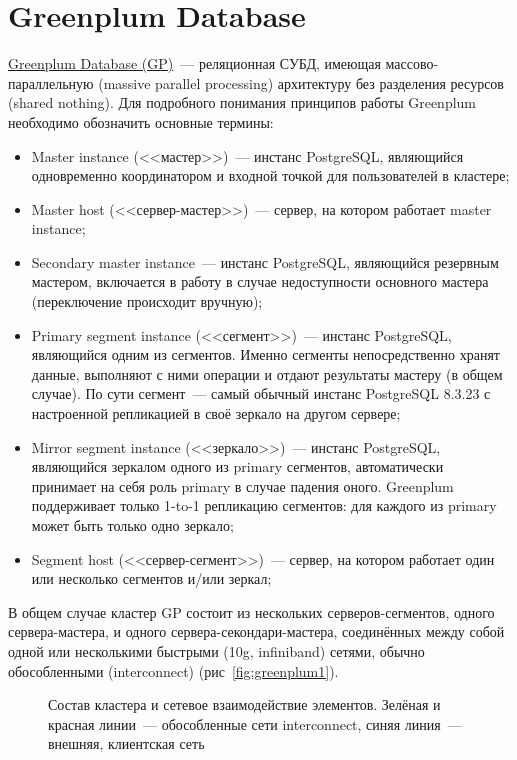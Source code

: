 \section{Greenplum Database}
\label{sec:greenplum}

\href{http://greenplum.org/}{Greenplum Database (GP)}~--- реляционная СУБД, имеющая массово-параллельную (massive parallel processing) архитектуру без разделения ресурсов (shared nothing). Для подробного понимания принципов работы Greenplum необходимо обозначить основные термины:

\begin{itemize}
  \item Master instance (<<мастер>>)~--- инстанс PostgreSQL, являющийся одновременно координатором и входной точкой для пользователей в кластере;
  \item Master host (<<сервер-мастер>>)~--- сервер, на котором работает master instance;
  \item Secondary master instance~--- инстанс PostgreSQL, являющийся резервным мастером, включается в работу в случае недоступности основного мастера (переключение происходит вручную);
  \item Primary segment instance (<<сегмент>>)~--- инстанс PostgreSQL, являющийся одним из сегментов. Именно сегменты непосредственно хранят данные, выполняют с ними операции и отдают результаты мастеру (в общем случае). По сути сегмент~--- самый обычный инстанс PostgreSQL 8.3.23 с настроенной репликацией в своё зеркало на другом сервере;
  \item Mirror segment instance (<<зеркало>>)~--- инстанс PostgreSQL, являющийся зеркалом одного из primary сегментов, автоматически принимает на себя роль primary в случае падения оного. Greenplum поддерживает только 1-to-1 репликацию сегментов: для каждого из primary может быть только одно зеркало;
  \item Segment host (<<сервер-сегмент>>)~--- сервер, на котором работает один или несколько сегментов и/или зеркал;
\end{itemize}

В общем случае кластер GP состоит из нескольких серверов-сегментов, одного сервера-мастера, и одного сервера-секондари-мастера, соединённых между собой одной или несколькими быстрыми (10g, infiniband) сетями, обычно обособленными (interconnect) (рис~\ref{fig:greenplum1}).

\begin{figure}[h!]
  \caption{Состав кластера и сетевое взаимодействие элементов. Зелёная и красная линии~--- обособленные сети interconnect, синяя линия~--- внешняя, клиентская сеть}
  \label{fig:greenplum_arch1}
\end{figure}

